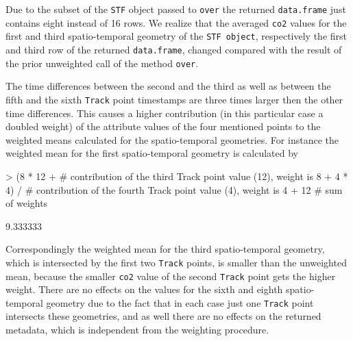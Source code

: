 \documentclass[12pt, oneside, a4paper]{scrbook}
\let\code=\texttt
\newcommand{\codeintitles}[1]{{\tt #1}} %
\begin{document}
Due to the subset of the \code{STF} object passed to \code{over} the returned \code{data.frame} just contains eight instead of 16 rows. 
We realize that the averaged \code{co2} values for the first and third spatio-temporal geometry of the \code{STF object}, respectively the first and third row of the returned \code{data.frame}, changed compared with the result of the prior unweighted call of the method \code {over}.
\par\medskip
The time differences between the second and the third as well as between the fifth and the sixth \code{Track} point timestamps are three times larger then the other time differences. 
This causes a higher contribution (in this particular case a doubled weight) of the attribute values of the four mentioned points to the weighted means calculated for the spatio-temporal geometries. 
For instance the weighted mean for the first spatio-temporal geometry is calculated by

\begin{small}
\begin{Schunk}
\begin{Sinput}
> (8 * 12 +   # contribution of the third Track point value (12), weight is 8
+  4 * 4) /   # contribution of the fourth Track point value (4), weight is 4
+  12         # sum of weights
\end{Sinput}
\begin{Soutput}
[1] 9.333333
\end{Soutput}
\end{Schunk}
\end{small}

Correspondingly the weighted mean for the third spatio-temporal geometry, which is intersected by the first two \code {Track} points, is smaller than the unweighted mean, because the smaller \code{co2} value of the second \code{Track} point gets the higher weight. 
There are no effects on the values for the sixth and eighth spatio-temporal geometry due to the fact that in each case just one \code{Track} point intersects these geometries, and as well there are no effects on the returned metadata, which is independent from the weighting procedure. 



\end{document}
